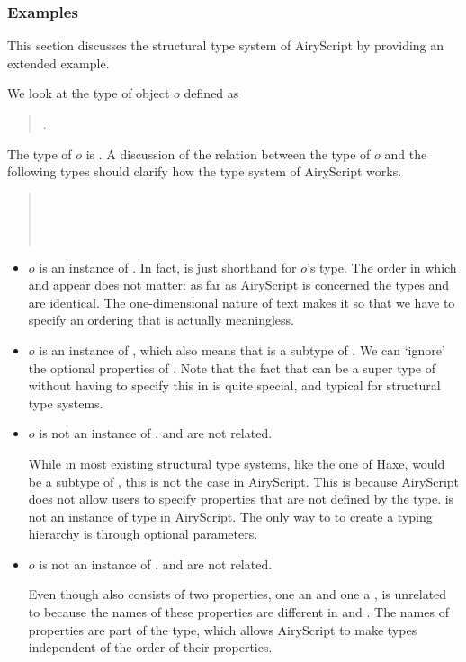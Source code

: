 \subsubsection{Examples}
\label{sec:type_examples}
This section discusses the structural type system of AiryScript by providing an
extended example.

We look at the type of object $o$ defined as
\begin{quote}
  .
\end{quote}
The type of $o$ is . A discussion of the relation between
the type of $o$ and the following types should clarify how the type system of
AiryScript works.
\begin{quote}
  \\
  \\
  \\
\end{quote}
\begin{itemize}
  \item $o$ is an instance of . In fact,  is just shorthand for
    $o$’s type. The order in which  and  appear does not matter:
    as far as AiryScript is concerned the types 
    and  are identical. The one-dimensional nature of text
    makes it so that we have to specify an ordering that is actually
    meaningless.

  \item $o$ is an instance of , which also means that  is a subtype
    of .  We can ‘ignore’ the optional properties of . Note that
    the fact that  can be a super type of  without having to specify
    this in  is quite special, and typical for structural type systems.

  \item $o$ is not an instance of .  and  are not related.

    While in most existing structural type systems, like the one of Haxe, 
    would be a subtype of , this is not the case in AiryScript. This is
    because AiryScript does not allow users to specify properties that are not
    defined by the type.  is not an instance of type  in AiryScript. The only way to to create a typing
    hierarchy is through optional parameters.

  \item $o$ is not an instance of .  and  are not related.

    Even though  also consists of two properties, one an  and one
    a ,  is unrelated to  because the names of these
    properties are different in  and . The names of properties are
    part of the type, which allows AiryScript to make types independent of the
    order of their properties.
\end{itemize}

